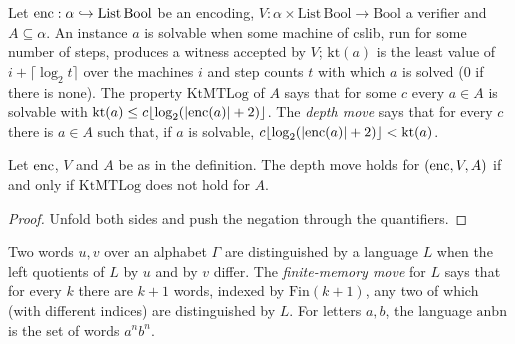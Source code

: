 \begin{definition}
  \label{def:structure-jugada-profundidad}
  \leanok
  Let $\mathrm{enc} : \alpha \hookrightarrow \mathrm{List}\,\mathrm{Bool}$ be an encoding, $V : \alpha
  \times \mathrm{List}\,\mathrm{Bool} \to \mathrm{Bool}$ a verifier and $A \subseteq \alpha$. An
  instance $a$ is solvable when some machine of cslib, run for some number of steps, produces a
  witness accepted by $V$; $\mathrm{kt}(a)$ is the least value of $i + \lceil \log_2 t \rceil$
  over the machines $i$ and step counts $t$ with which $a$ is solved ($0$ if there is none). The
  property $\mathrm{KtMTLog}$ of $A$ says that for some $c$ every $a \in A$ is solvable with
  $\mathrm{kt}(a) \le c \lfloor \log_2 (|\mathrm{enc}(a)| + 2) \rfloor$. The \emph{depth move} says that for
  every $c$ there is $a \in A$ such that, if $a$ is solvable, $c \lfloor \log_2 (|\mathrm{enc}(a)| + 2)
  \rfloor < \mathrm{kt}(a)$.
  \own{}
\end{definition}

\begin{theorem}
  \label{thm:structure-jugada-iff}
  \leanok
  Let $\mathrm{enc}$, $V$ and $A$ be as in the definition. The depth move holds for $(\mathrm{enc}, V, A)$ if and
  only if $\mathrm{KtMTLog}$ does not hold for $A$.
  \own{}
\end{theorem}

\begin{proof}
  \leanok
  Unfold both sides and push the negation through the quantifiers.
\end{proof}

\begin{definition}
  \label{def:structure-jugada-finita}
  \leanok
  Two words $u, v$ over an alphabet $\Gamma$ are distinguished by a language $L$ when the left
  quotients of $L$ by $u$ and by $v$ differ. The \emph{finite-memory move} for $L$ says that for
  every $k$ there are $k + 1$ words, indexed by $\mathrm{Fin}(k+1)$, any two of which (with different
  indices) are distinguished by $L$. For letters $a, b$, the language $\mathrm{anbn}$ is the set of
  words $a^n b^n$.
  \own{}
\end{definition}

